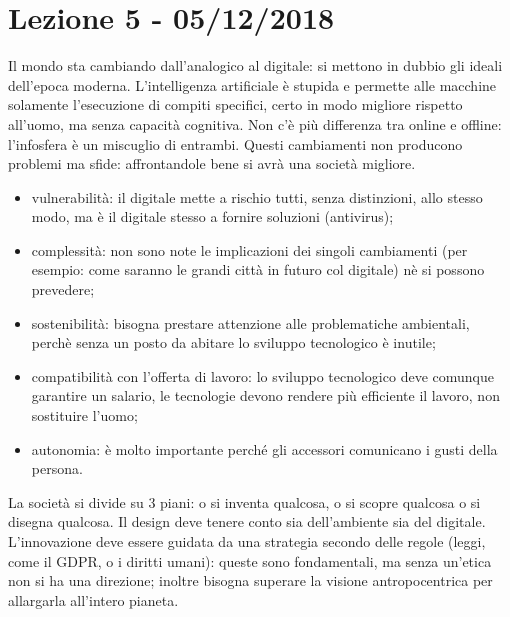 \documentclass[a4page, 11pt]{article}
\begin{document}
\section*{Lezione 5 - 05/12/2018}
Il mondo sta cambiando dall'analogico al digitale: si mettono in dubbio gli ideali dell'epoca moderna.
L'intelligenza artificiale è stupida e permette alle macchine solamente l'esecuzione di compiti specifici, certo in modo migliore rispetto all'uomo, ma senza capacità cognitiva.
Non c'è più differenza tra online e offline: l'infosfera è un miscuglio di entrambi.
Questi cambiamenti non producono problemi ma sfide: affrontandole bene si avrà una società migliore.
\begin{itemize}
  \def\labelenumi{\arabic{enumi})}
  \item vulnerabilità: il digitale mette a rischio tutti, senza distinzioni, allo stesso modo, ma è il digitale stesso a fornire soluzioni (antivirus);
  \item complessità: non sono note le implicazioni dei singoli cambiamenti (per esempio: come saranno le grandi città in futuro col digitale) nè si possono prevedere;
  \item sostenibilità: bisogna prestare attenzione alle problematiche ambientali, perchè senza un posto da abitare lo sviluppo tecnologico è inutile;
  \item compatibilità con l'offerta di lavoro: lo sviluppo tecnologico deve comunque garantire un salario, le tecnologie devono rendere più efficiente il lavoro, non sostituire l'uomo;
  \item autonomia: è molto importante perché gli accessori comunicano i gusti della persona.
\end{itemize}

La società si divide su 3 piani: o si inventa qualcosa, o si scopre qualcosa o si disegna qualcosa.
Il design deve tenere conto sia dell'ambiente sia del digitale.
L'innovazione deve essere guidata da una strategia secondo delle regole (leggi, come il GDPR, o i diritti umani): queste sono fondamentali, ma senza un'etica non si ha una direzione; inoltre bisogna superare la visione antropocentrica per allargarla all'intero pianeta.
\end{document}
